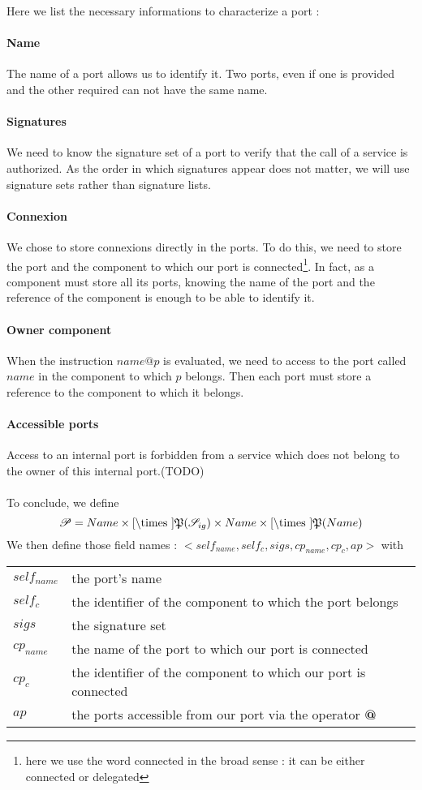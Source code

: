 Here we list the necessary informations to characterize a port :
\paragraph{Name} The name of a port allows us to identify it. Two ports, even if one is provided and the other required can not have the same name. 
\paragraph{Signatures} We need to know the signature set of a port to verify that the call of a service is authorized. As the order in which signatures appear does not matter, we will use signature sets rather than signature lists.
\paragraph{Connexion}
We chose to store connexions directly in the ports. To do this, we need to store the port and the component to which our port is connected\footnote{here we use the word connected in the broad sense : it can be either connected or delegated}. In fact, as a component must store all its ports, knowing the name of the port  and the reference of the component is enough to be able to identify it.
\paragraph{Owner component}
When the instruction $name@p$ is evaluated, we need to access to the port called $name$ in the component to which $p$ belongs. Then each port must store a reference to the component to which it belongs.

\paragraph{Accessible ports}
Access to an internal port is forbidden from a service which does not belong to the owner of this internal port.(TODO)

\paragraph{}

To conclude, we define
\[\Po = Name \times \Cref \times \mathfrak{P}(\Sig)\times Name \times \Cref \times \mathfrak{P}(Name)\]
We then define those field names : $<self_{name}, self_c,sigs,cp_{name},cp_{c},ap>$ with

\begin{tabular}{ll}
$self_{name}$ & the port's name\\
$self_c$ & the identifier of the component to which the port belongs\\
$sigs$ & the signature set\\
$cp_{name}$ &  the name of the port to which our port is connected \\
$cp_c$ & the identifier of the component to which our port is connected \\
$ap$ & the ports accessible from our port via the operator \textbf{@}
\end{tabular}




